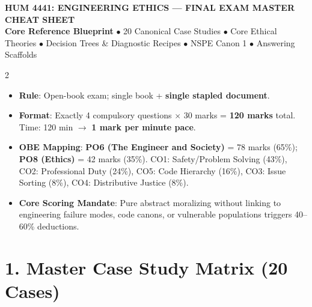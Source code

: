 \documentclass[9pt,a4paper]{extarticle}
\begin{document}
\begin{center}
  {\color{primary}\large\bfseries HUM 4441: ENGINEERING ETHICS — FINAL EXAM MASTER CHEAT SHEET}\\[1.5pt]
  {\footnotesize\textbf{Core Reference Blueprint} $\bullet$ 20 Canonical Case Studies $\bullet$ Core Ethical Theories $\bullet$ Decision Trees \& Diagnostic Recipes $\bullet$ NSPE Canon 1 $\bullet$ Answering Scaffolds}
\end{center}
\vspace{-6pt}

\begin{multicols}{2}

\begin{tcolorbox}[compact,colback=primary!5!white,colframe=primary,title={EXAM ARCHITECTURE \& MARKING BLUEPRINT}]
\begin{itemize}[leftmargin=9pt]
  \item \textbf{Rule}: Open-book exam; single book + \textbf{single stapled document}.
  \item \textbf{Format}: Exactly 4 compulsory questions $\times$ 30 marks = \textbf{120 marks} total. Time: 120 min $\rightarrow$ \textbf{1 mark per minute pace}.
  \item \textbf{OBE Mapping}: \textbf{PO6 (The Engineer and Society)} = 78 marks (65\%); \textbf{PO8 (Ethics)} = 42 marks (35\%). CO1: Safety/Problem Solving (43\%), CO2: Professional Duty (24\%), CO5: Code Hierarchy (16\%), CO3: Issue Sorting (8\%), CO4: Distributive Justice (8\%).
  \item \textbf{Core Scoring Mandate}: Pure abstract moralizing without linking to engineering failure modes, code canons, or vulnerable populations triggers 40--60\% deductions.
\end{itemize}
\end{tcolorbox}

\section{1. Master Case Study Matrix (20 Cases)}


\end{multicols}
\end{document}

